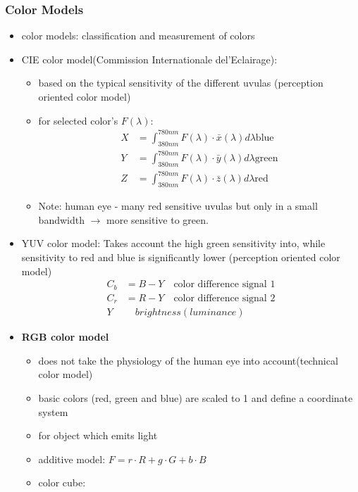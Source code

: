 \documentclass{standalone}
\begin{document}
\subsubsection*{Color Models}
\begin{itemize}
		\item color models: classification and measurement of colors
		\item CIE color model(Commission Internationale del'Eclairage):
			\begin{itemize} 
				\item based on the typical sensitivity of the different uvulas (perception oriented color model)
				\item for selected color's $F(\lambda)$:
					\begin{align}
						X &= \int_{380nm}^{780nm} F(\lambda) \cdot \bar{x}(\lambda) d\lambda \text{blue}\\
						Y &= \int_{380nm}^{780nm} F(\lambda) \cdot \bar{y}(\lambda) d\lambda \text{green}\\
						Z &= \int_{380nm}^{780nm} F(\lambda) \cdot \bar{z}(\lambda) d\lambda \text{red}
					\end{align}
				\item Note: human eye - many red sensitive uvulas but only in a small bandwidth $\rightarrow$ more sensitive to green. 
			\end{itemize}
		\item YUV color model: Takes account the high green sensitivity into, while sensitivity to red and blue is significantly lower (perception oriented color model)
		\begin{align}
			C_b &= B - Y \quad \text{color difference signal 1}\\
			C_r &= R - Y \quad \text{color difference signal 2}\\
			Y & \quad brightness (luminance)
		\end{align}
		\item \textbf{RGB color model}
			\begin{itemize} 
				\item does not take the physiology of the human eye into account(technical color model)
				\item basic colors (red, green and blue) are scaled to 1 and define a coordinate system
				\item for object which emits light
				\item additive model: $F = r \cdot R + g \cdot G + b \cdot B$
				\item color cube:

\end{itemize}
\end{itemize}
\end{document}
